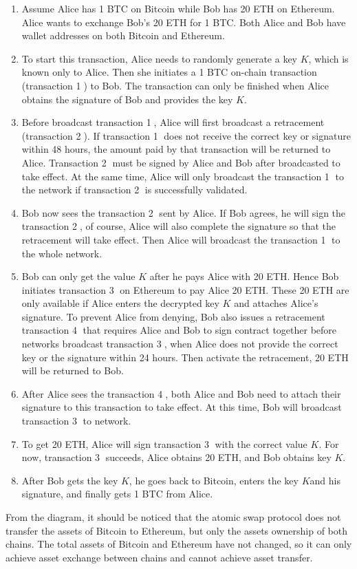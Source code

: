 \begin{enumerate}
  \item Assume Alice has 1 BTC on Bitcoin while Bob has 20 ETH on Ethereum. Alice wants to exchange Bob's 20 ETH for 1 BTC. Both Alice and Bob have wallet addresses on both Bitcoin and Ethereum.
    \item To start this transaction, Alice needs to randomly generate a key $K$, which is known only to Alice. Then she initiates a 1 BTC on-chain transaction (transaction \textcircled{1}) to Bob. The transaction can only be finished when Alice obtains the signature of Bob and provides the key $K$.
    \item Before broadcast transaction \textcircled{1}, Alice will first broadcast a retracement (transaction \textcircled{2}). If transaction \textcircled{1} does not receive the correct key or signature within 48 hours, the amount paid by that transaction will be returned to Alice. Transaction \textcircled{2} must be signed by Alice and Bob after broadcasted to take effect. At the same time, Alice will only broadcast the transaction \textcircled{1} to the network if transaction \textcircled{2} is successfully validated.
    \item Bob now sees the transaction \textcircled{2} sent by Alice. If Bob agrees, he will sign the transaction \textcircled{2}, of course, Alice will also complete the signature so that the retracement will take effect. Then Alice will broadcast the transaction \textcircled{1} to the whole network.
    \item Bob can only get the value $K$ after he pays Alice with 20 ETH. Hence Bob initiates transaction \textcircled{3} on Ethereum to pay Alice 20 ETH. These 20 ETH are only available if Alice enters the decrypted key $K$ and attaches Alice's signature. To prevent Alice from denying, Bob also issues a retracement transaction \textcircled{4} that requires Alice and Bob to sign contract together before networks broadcast transaction \textcircled{3}, when Alice does not provide the correct key or the signature within 24 hours. Then activate the retracement, 20 ETH will be returned to Bob.
    \item After Alice sees the transaction \textcircled{4}, both Alice and Bob need to attach their signature to this transaction to take effect. At this time, Bob will broadcast transaction \textcircled{3} to network.
    \item To get 20 ETH, Alice will sign transaction \textcircled{3} with the correct value $K$. For now, transaction \textcircled{3} succeeds, Alice obtains 20 ETH, and Bob obtains key $K$.
    \item After Bob gets the key $K$, he goes back to Bitcoin, enters the key $K $and his signature, and finally gets 1 BTC from Alice.
\end{enumerate}
\noindent From the diagram, it should be noticed that the atomic swap protocol does not transfer the assets of Bitcoin to Ethereum, but only the assets ownership of both chains. The total assets of Bitcoin and Ethereum have not changed, so it can only achieve asset exchange between chains and cannot achieve asset transfer.\\

